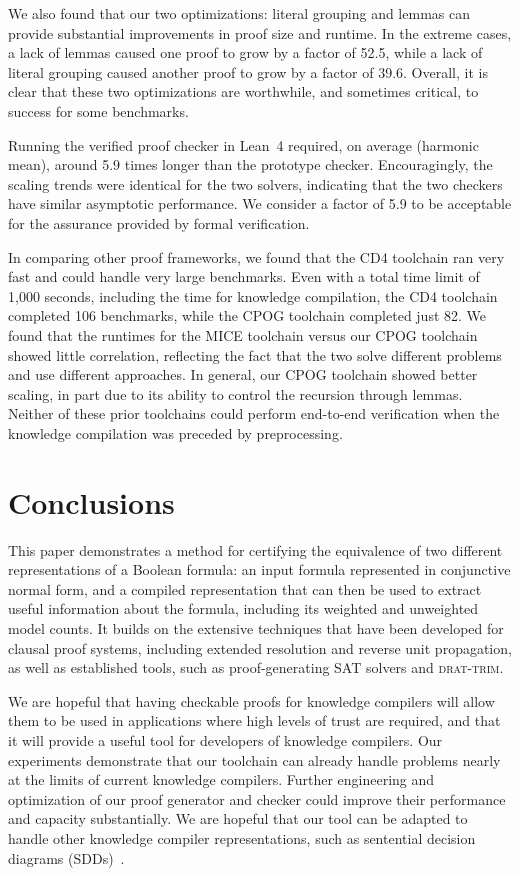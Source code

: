 \documentclass[letterpaper,USenglish,cleveref, autoref, thm-restate]{lipics-v2021}
\newcommand{\progname}[1]{\textsc{#1}}
\newcommand{\cdfour}{\progname{CD4}}
\newcommand{\dtrim}{\progname{drat-trim}}
\newcommand{\lean}{Lean~4}
\begin{document}
We also found that our two optimizations: literal grouping and
lemmas can provide substantial improvements in proof size and runtime.
In the extreme cases, a lack
of lemmas caused one proof to grow by a factor of 52.5, while a lack
of literal grouping caused another proof to grow by a factor of 39.6.
Overall, it is clear that these two optimizations are worthwhile, and
sometimes critical, to success for some benchmarks.

Running the verified proof checker in \lean{} required, on average
(harmonic mean), around 5.9 times longer than the prototype checker.
Encouragingly, the scaling trends were identical for the two solvers,
indicating that the two checkers have similar asymptotic performance.
We consider a factor of 5.9 to be acceptable for the assurance
provided by formal verification.

In comparing other proof frameworks, we found that the \cdfour{}
toolchain ran very fast and could handle very large benchmarks.  Even
with a total time limit of 1,000 seconds, including the time for
knowledge compilation, the \cdfour{} toolchain completed 106
benchmarks, while the CPOG toolchain completed just 82.  We found
that the runtimes for the MICE toolchain versus our CPOG toolchain
showed little correlation, reflecting the fact that the two solve
different problems and use different approaches.  In general, our CPOG
toolchain showed better scaling, in part due to its ability to control
the recursion through lemmas.  Neither of these prior
toolchains could perform end-to-end verification when the knowledge
compilation was preceded by preprocessing.

\section{Conclusions}
\label{sect:future}

This paper demonstrates a method for certifying the equivalence of two
different representations of a Boolean formula: an input formula
represented in conjunctive normal form, and a compiled representation
that can then be used to extract useful information about the formula,
including its weighted and unweighted model counts.  It builds on the
extensive techniques that have been developed for clausal
proof systems, including extended resolution and reverse unit propagation, as well as established tools, such as
proof-generating SAT solvers and \dtrim{}.


We are hopeful that having checkable proofs for knowledge compilers
will allow them to be used in applications where high levels of trust
are required, and that it will provide a useful tool for developers of
knowledge compilers.
Our experiments demonstrate that our toolchain can already handle
problems nearly at the limits of current knowledge compilers.  Further
engineering and optimization of our proof generator and checker could
improve their performance and capacity substantially.  We are hopeful
that our tool can be adapted to handle other knowledge compiler
representations, such as sentential decision diagrams (SDDs)~\cite{darwiche:ijcai:2011}.
\end{document}
